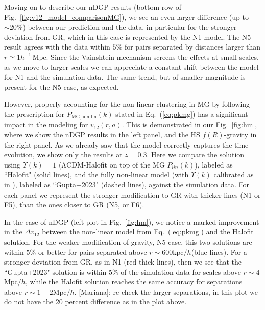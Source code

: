 \documentclass[%
 reprint,
groupedaddress,
nofootinbib,
nobibnotes,
 amsmath,amssymb,
 aps,
]{revtex4-2}
\newcommand{\refeq}[1]{Eq.~(\ref{eq:#1})}
\newcommand{\reffig}[1]{Fig.~\ref{fig:#1}}
\newcommand{\pairvel}{$v_{12}(r,a)$}
\newcommand{\lcdm}{$\mathrm{\Lambda CDM}$}
\newcommand{\Mpch}{$h^{-1}\,\mbox{Mpc}$}
\newcommand{\MpchInv}{$\mbox{Mpc}/h$}
\newcommand{\kpchInv}{$\mbox{kpc}/h$}
\newcommand{\<}{\langle}
\renewcommand{\>}{\rangle}
\newcommand{\MJ}[1]{\textcolor{WildStrawberry}{[Mariana]: #1}}
\begin{document}
Moving on to describe our nDGP results (bottom row of \reffig{v12_model_comparisonMG}), we see an even larger difference (up to $\sim20\%$)  between our prediction and the data, in particular for the stronger deviation from GR, which in this case is represented by the N1 model. The N5 result agrees with the data within $5\%$ for pairs separated  by distances larger than $r\simeq1$\Mpch. Since the Vainshtein mechanism screens the effects at small scales, as we move to larger scales we can appreciate a constant shift between the model for N1 and the simulation data. The same trend, but of smaller magnitude is present for the N5 case, as expected.%



However, properly accounting for the non-linear clustering in MG by following the prescription for $P_{\text{MG,non-lin}}(k)$ stated in \refeq{pkmg} has a significant impact in the modeling for \pairvel{}. This is demonstrated in our \reffig{hm}, where we show the nDGP results in the left panel, and the HS $f(R)$-gravity in the right panel. 
%
As we already saw that the model correctly captures the time evolution, we show only the results at $z=0.3$.
%
Here we compare the solution using $\Upsilon(k)=1$ (\lcdm{}-Halofit on top of the MG $P_{lin}(k)$), labeled as ``Halofit" (solid lines), and the fully non-linear model (with $\Upsilon(k)$ calibrated as in \cite{2023MNRAS.522.5291G}), labeled as ``Gupta+2023" (dashed lines), against the simulation data. For each panel we represent the stronger modification to GR with thicker lines (N1 or F5), than the ones closer to GR (N5, or F6).

In the case of nDGP (left plot in \reffig{hm}),  we notice a marked improvement in the $\Delta v_{12}$ between the non-linear model from \refeq{pkmg} and the Halofit solution. For the weaker modification of gravity, N5 case, this two solutions are within $5\%$ or better for pairs separated  above $r\sim600$\kpchInv (blue lines). For a stronger deviation from GR, as in N1 (red thick lines), then we see that the ``Gupta+2023" solution is within $5\%$ of the simulation data for scales above $r\sim4$\MpchInv, while the Halofit solution reaches the same accuracy for separations above  $r\sim1-2$\MpchInv. \MJ{re-check the larger separations, in this plot we do not have the 20 percent difference as in the plot above}.
\end{document}
